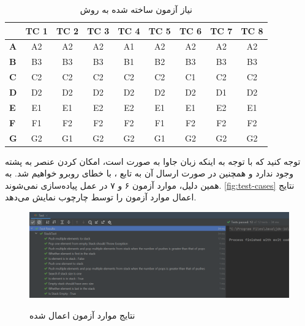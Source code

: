 \documentclass[twoside]{article}
\newenvironment{answer}{}{\medskip}
\begin{document}
\begin{answer}
	\begin{table}[h]
		\centering
		\caption{نیاز آزمون ساخته شده به روش }
		\label{tbl:ec-test-cases}
		\begin{latin}
		\begin{tabular}{l|c|c|c|c|c|c|c|c|}
			\cline{2-9}
			& \textbf{TC 1} & \textbf{TC 2} & \textbf{TC 3} & \textbf{TC 4} & \textbf{TC 5} & \textbf{TC 6} & \textbf{TC 7} & \textbf{TC 8} \\ \hline
			\multicolumn{1}{|l|}{\textbf{A}} & A2         & A2         & A2         & A1         & A2         & A2         & A2         & A2         \\ \hline
			\multicolumn{1}{|l|}{\textbf{B}} & B3         & B3         & B3         & B1         & B2         & B3         & B3         & B3         \\ \hline
			\multicolumn{1}{|l|}{\textbf{C}} & C2         & C2         & C2         & C2         & C2         & C1         & C2         & C2         \\ \hline
			\multicolumn{1}{|l|}{\textbf{D}} & D2         & D2         & D2         & D2         & D2         & D2         & D1         & D2         \\ \hline
			\multicolumn{1}{|l|}{\textbf{E}} & E1         & E1         & E2         & E2         & E1         & E1         & E2         & E1         \\ \hline
			\multicolumn{1}{|l|}{\textbf{F}} & F1         & F2         & F2         & F2         & F1         & F2         & F2         & F2         \\ \hline
			\multicolumn{1}{|l|}{\textbf{G}} & G2         & G1         & G2         & G2         & G1         & G2         & G2         & G2         \\ \hline
		\end{tabular}
	\end{latin}
	\end{table}

توجه کنید که با توجه به اینکه زبان جاوا به صورت  است، امکان  کردن عنصر  به پشته وجود ندارد و همچنین در صورت ارسال آن به تابع ، با خطای  روبرو خواهیم شد. به همین دلیل، موارد آزمون ۶ و ۷ در عمل پیاده‌سازی نمی‌شوند. \autoref{fig:test-cases} نتایج اعمال موارد آزمون را توسط چارچوب  نمایش می‌دهد.

\begin{figure}
	\caption{نتایج موارد آزمون اعمال شده}
	\includegraphics[width=\textwidth]{test-status-q3}
	\label{fig:test-cases}
\end{figure}
\end{answer}
\end{document}
